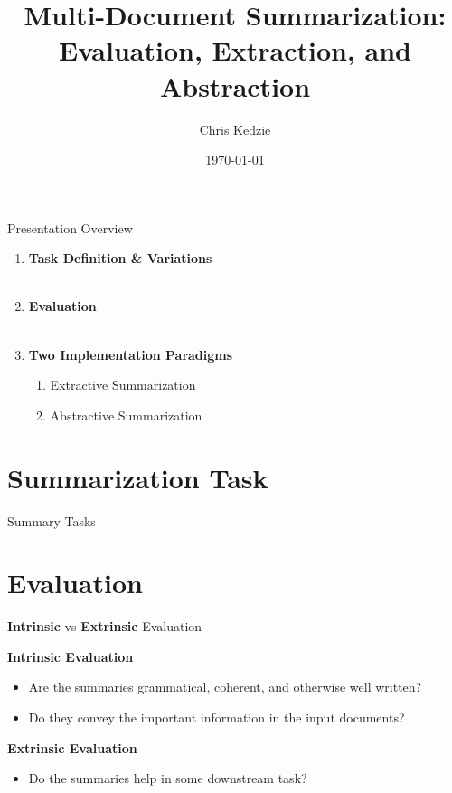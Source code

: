 \documentclass[xcolor={table}]{beamer}
\title{Multi-Document Summarization: Evaluation, Extraction, and Abstraction}
\date{\today}
\author{Chris Kedzie}
\institute{Dept. of Computer Science, Columbia University}
\begin{document}
  \maketitle


\begin{frame}{Presentation Overview}

\begin{enumerate}
    \item \textbf{Task Definition \& Variations}
        ~\\~\\
    \item \textbf{Evaluation}
        ~\\~\\
    \item \textbf{Two Implementation Paradigms}
\begin{enumerate}
\item Extractive Summarization
\item Abstractive Summarization
\end{enumerate}
\end{enumerate}

\end{frame}


\section{Summarization Task}




\begin{frame}{Summary Tasks}
\end{frame}





\section{Evaluation}

\begin{frame}{\textbf{Intrinsic} vs \textbf{Extrinsic} Evaluation}

\textbf{Intrinsic Evaluation}
\begin{itemize}
\item Are the summaries grammatical, coherent, and otherwise well written?
\item Do they convey the important information in the input documents?
\end{itemize}
\textbf{Extrinsic Evaluation}
\begin{itemize}
\item Do the summaries help in some downstream task? 
\end{itemize}
\end{frame}
\end{document}
